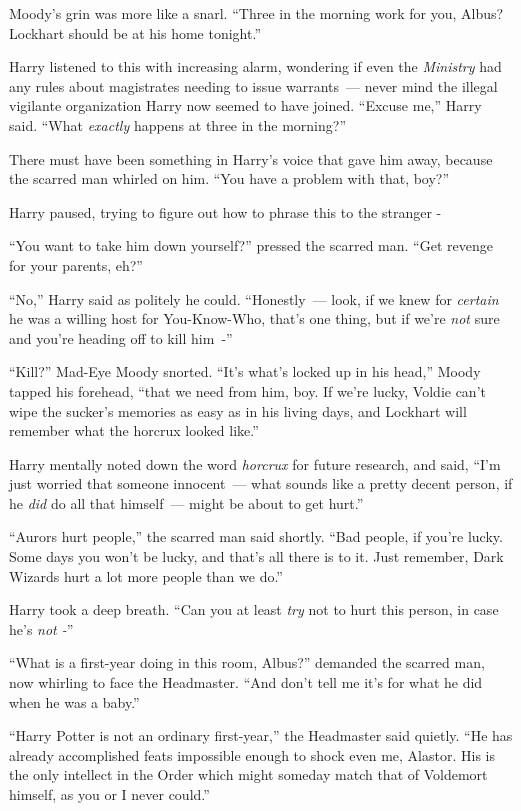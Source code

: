 Moody's grin was more like a snarl. ``Three in the morning work for you, Albus? Lockhart should be at his home tonight.''

Harry listened to this with increasing alarm, wondering if even the \emph{Ministry} had any rules about magistrates needing to issue warrants~--- never mind the illegal vigilante organization Harry now seemed to have joined. ``Excuse me,'' Harry said. ``What \emph{exactly} happens at three in the morning?''

There must have been something in Harry's voice that gave him away, because the scarred man whirled on him. ``You have a problem with that, boy?''

Harry paused, trying to figure out how to phrase this to the stranger -

``You want to take him down yourself?'' pressed the scarred man. ``Get revenge for your parents, eh?''

``No,'' Harry said as politely he could. ``Honestly~--- look, if we knew for \emph{certain} he was a willing host for You-Know-Who, that's one thing, but if we're \emph{not} sure and you're heading off to kill him~-''

``Kill?'' Mad-Eye Moody snorted. ``It's what's locked up in his head,'' Moody tapped his forehead, ``that we need from him, boy. If we're lucky, Voldie can't wipe the sucker's memories as easy as in his living days, and Lockhart will remember what the horcrux looked like.''

Harry mentally noted down the word \emph{horcrux} for future research, and said, ``I'm just worried that someone innocent~--- what sounds like a pretty decent person, if he \emph{did} do all that himself~--- might be about to get hurt.''

``Aurors hurt people,'' the scarred man said shortly. ``Bad people, if you're lucky. Some days you won't be lucky, and that's all there is to it. Just remember, Dark Wizards hurt a lot more people than we do.''

Harry took a deep breath. ``Can you at least \emph{try} not to hurt this person, in case he's \emph{not -}''

``What is a first-year doing in this room, Albus?'' demanded the scarred man, now whirling to face the Headmaster. ``And don't tell me it's for what he did when he was a baby.''

``Harry Potter is not an ordinary first-year,'' the Headmaster said quietly. ``He has already accomplished feats impossible enough to shock even me, Alastor. His is the only intellect in the Order which might someday match that of Voldemort himself, as you or I never could.''

